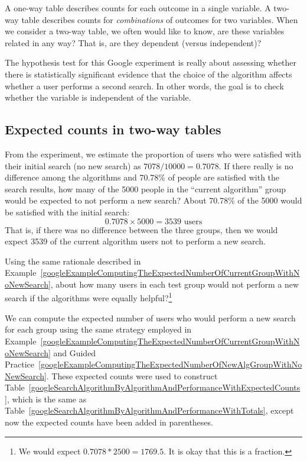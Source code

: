\begin{tipBox}{
A one-way table describes counts for each outcome in a single variable. A two-way table describes counts for \emph{combinations} of outcomes for two variables. When we consider a two-way table, we often would like to know, are these variables related in any way? That is, are they dependent (versus independent)?}
\end{tipBox}

The hypothesis test for this Google experiment is really about assessing whether there is statistically significant evidence that the choice of the algorithm affects whether a user performs a second search. In other words, the goal is to check whether the  variable is independent of the  variable.


\subsection{Expected counts in two-way tables}

\begin{example}{From the experiment, we estimate the proportion of users who were satisfied with their initial search (no new search) as $7078/10000 = 0.7078$. If there really is no difference among the algorithms and 70.78\% of people are satisfied with the search results, how many of the 5000 people in the ``current algorithm'' group would be expected to not perform a new search?} \label{googleExampleComputingTheExpectedNumberOfCurrentGroupWithNoNewSearch}
About 70.78\% of the 5000 would be satisfied with the initial search:
$$ 0.7078\times 5000 = 3539\text{ users} $$
That is, if there was no difference between the three groups, then we would expect 3539 of the current algorithm users not to perform a new search.
\end{example}

\begin{exercise}\label{googleExampleComputingTheExpectedNumberOfNewAlgGroupWithNoNewSearch}
Using the same rationale described in Example~\ref{googleExampleComputingTheExpectedNumberOfCurrentGroupWithNoNewSearch}, about how many users in each test group would not perform a new search if the algorithms were equally helpful?\footnote{We would expect $0.7078*2500 = 1769.5$. It is okay that this is a fraction.}
\end{exercise}

We can compute the expected number of users who would perform a new search for each group using the same strategy employed in Example~\ref{googleExampleComputingTheExpectedNumberOfCurrentGroupWithNoNewSearch} and Guided Practice~\ref{googleExampleComputingTheExpectedNumberOfNewAlgGroupWithNoNewSearch}. These expected counts were used to construct Table~\ref{googleSearchAlgorithmByAlgorithmAndPerformanceWithExpectedCounts}, which is the same as Table~\ref{googleSearchAlgorithmByAlgorithmAndPerformanceWithTotals}, except now the expected counts have been added in parentheses.

